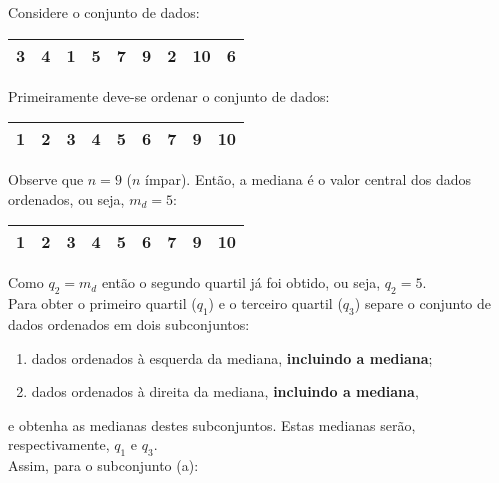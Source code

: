 \documentclass[11pt,fleqn]{book} %
\begin{document}
\begin{example} \label{exemp:quartis1}

Considere o conjunto de dados:

\begin{center}
	\begin{tabular}{c c c c c c c c c}
	\hline
	3 & 4 & 1 & 5 & 7 & 9 & 2 & 10 & 6 \\
	\hline
	\end{tabular}
\end{center}

Primeiramente deve-se ordenar o conjunto de dados:

\begin{center}
	\begin{tabular}{c c c c c c c c c}
	\hline
	1 & 2 & 3 & 4 & 5 & 6 & 7 & 9 & 10 \\
	\hline
	\end{tabular}
\end{center}

Observe que $n=9$ ($n$ ímpar). Então, a mediana é o valor central dos dados ordenados, ou seja, $m_d=5$:

\begin{center}
	\begin{tabular}{c c c c c c c c c}
	\hline
	1 & 2 & 3 & 4 & \textcolor{ocre}{\bf 5} & 6 & 7 & 9 & 10 \\
	\hline
	\end{tabular}
\end{center}

Como $q_2=m_d$ então o segundo quartil já foi obtido, ou seja, $q_2=5$. \\

Para obter o primeiro quartil ($q_1$) e o terceiro quartil ($q_3$) separe o conjunto de dados ordenados em dois subconjuntos: \\

\begin{enumerate}[label=\alph*)]
\item dados ordenados à esquerda da mediana, {\bf incluindo a mediana};
\item dados ordenados à direita da mediana, {\bf incluindo a mediana}, \\
\end{enumerate}

\noindent e obtenha as medianas destes subconjuntos. Estas medianas serão, respectivamente, $q_1$ e $q_3$. \\

Assim, para o subconjunto (a):


\end{example}
\end{document}
